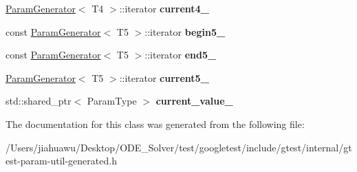 \begin{DoxyCompactItemize}
\item 
\mbox{\label{classtesting_1_1internal_1_1_cartesian_product_generator5_1_1_iterator_a0fce691dadd17d9ec6bc2d09fd8906a5}} 
\mbox{\hyperlink{classtesting_1_1internal_1_1_param_generator}{Param\+Generator}}$<$ T4 $>$\+::iterator {\bfseries current4\+\_\+}
\item 
\mbox{\label{classtesting_1_1internal_1_1_cartesian_product_generator5_1_1_iterator_a552be8f7e42ab6fb1e9c07d49d660d02}} 
const \mbox{\hyperlink{classtesting_1_1internal_1_1_param_generator}{Param\+Generator}}$<$ T5 $>$\+::iterator {\bfseries begin5\+\_\+}
\item 
\mbox{\label{classtesting_1_1internal_1_1_cartesian_product_generator5_1_1_iterator_ad048a7619cf82e9457bcde096970d296}} 
const \mbox{\hyperlink{classtesting_1_1internal_1_1_param_generator}{Param\+Generator}}$<$ T5 $>$\+::iterator {\bfseries end5\+\_\+}
\item 
\mbox{\label{classtesting_1_1internal_1_1_cartesian_product_generator5_1_1_iterator_a2a6b4ba75ba79eb74cb05f4ac80f1cb3}} 
\mbox{\hyperlink{classtesting_1_1internal_1_1_param_generator}{Param\+Generator}}$<$ T5 $>$\+::iterator {\bfseries current5\+\_\+}
\item 
\mbox{\label{classtesting_1_1internal_1_1_cartesian_product_generator5_1_1_iterator_ae2fcf3547b56f2805c82ef0aae014ca5}} 
std\+::shared\+\_\+ptr$<$ Param\+Type $>$ {\bfseries current\+\_\+value\+\_\+}
\end{DoxyCompactItemize}


The documentation for this class was generated from the following file\+:\begin{DoxyCompactItemize}
\item 
/\+Users/jiahuawu/\+Desktop/\+O\+D\+E\+\_\+\+Solver/test/googletest/include/gtest/internal/gtest-\/param-\/util-\/generated.\+h\end{DoxyCompactItemize}

